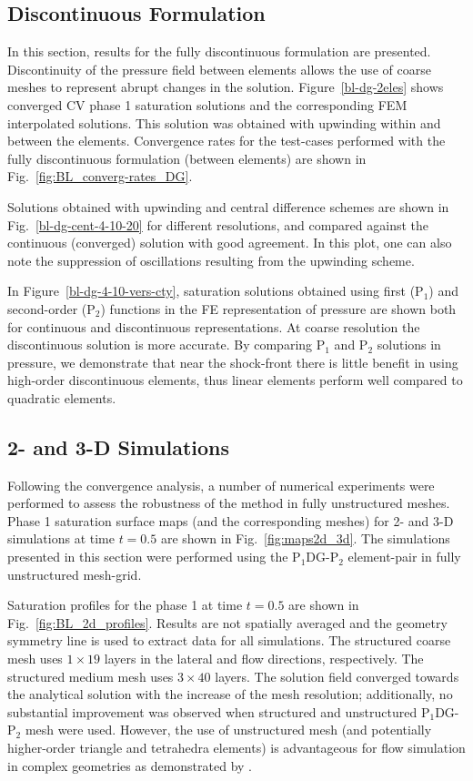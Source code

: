 \documentclass[preprint,authoryear,12pt]{elsarticle}
\newcommand{\PN}[2][error]{P$_{#1}$DG-P$_{#2}$}
\begin{document}
\subsection{Discontinuous Formulation}
In this section, results for the fully discontinuous formulation are
presented. Discontinuity of the pressure field between elements allows
the use of coarse meshes to represent abrupt changes in the
solution. Figure~\ref{bl-dg-2eles} shows converged CV phase 1
saturation solutions and the corresponding FEM interpolated
solutions. This solution was obtained with upwinding within and
between the elements.  Convergence rates for the test-cases performed
with the fully discontinuous formulation (between elements) are shown
in Fig.~\ref{fig:BL_converg-rates_DG}.

Solutions obtained with upwinding and central difference schemes are
shown in Fig.~\ref{bl-dg-cent-4-10-20} for different resolutions, and
compared against the continuous (converged) solution with good
agreement. In this plot, one can also note the suppression of
oscillations resulting from the upwinding scheme.

In Figure~\ref{bl-dg-4-10-vers-cty}, saturation solutions obtained
using first (P$_{1}$) and second-order (P$_{2}$) functions in the FE
representation of pressure are shown both for continuous and
discontinuous representations. At coarse resolution the discontinuous
solution is more accurate. By comparing P$_{1}$ and P$_{2}$ solutions
in pressure, we demonstrate that near the shock-front there is little
benefit in using high-order discontinuous elements, thus linear
elements perform well compared to quadratic elements.

\subsection{2- and 3-D Simulations}
Following the convergence analysis, a number of numerical experiments
were performed to assess the robustness of the method in fully
unstructured meshes. Phase 1 saturation surface maps (and the
corresponding meshes) for 2- and 3-D simulations at time $t=0.5$ are
shown in Fig.~\ref{fig:maps2d_3d}. The simulations presented in this
section were performed using the \PN[1]{2} element-pair in fully
unstructured mesh-grid.

Saturation profiles for the phase 1 at time $t=0.5$ are shown in
Fig.~\ref{fig:BL_2d_profiles}. Results are not spatially averaged and
the geometry symmetry line is used to extract data for all
simulations. The structured coarse mesh uses $1 \times 19$ layers in
the lateral and flow directions, respectively. The structured medium
mesh uses $3 \times 40$ layers. The solution field converged towards
the analytical solution with the increase of the mesh resolution;
additionally, no substantial improvement was observed when structured
and unstructured \PN[1]{2} mesh were used. However, the use of
unstructured mesh (and potentially higher-order triangle and
tetrahedra elements) is advantageous for flow simulation in complex
geometries as demonstrated by \cite{jackson_2013}.
\end{document}
